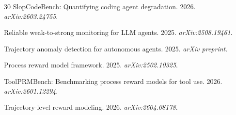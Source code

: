 \documentclass[11pt,a4paper]{article}
\begin{document}
\begin{thebibliography}{30}
SlopCodeBench: Quantifying coding agent degradation.
2026.
\emph{arXiv:2603.24755}.

Reliable weak-to-strong monitoring for LLM agents.
2025.
\emph{arXiv:2508.19461}.

Trajectory anomaly detection for autonomous agents.
2025.
\emph{arXiv preprint}.

Process reward model framework.
2025.
\emph{arXiv:2502.10325}.

ToolPRMBench: Benchmarking process reward models for tool use.
2026.
\emph{arXiv:2601.12294}.

Trajectory-level reward modeling.
2026.
\emph{arXiv:2604.08178}.

\end{thebibliography}
\end{document}
